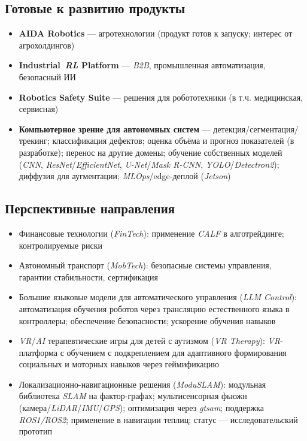 \documentclass[12pt,a4paper]{article}
\begin{document}
\subsection*{Готовые к развитию продукты}
\begin{itemize}
    \item \textbf{AIDA Robotics} --- агротехнологии (продукт готов к запуску; интерес от агрохолдингов)
    \item \textbf{Industrial~\textit{RL} Platform} --- \textit{B2B}, промышленная автоматизация, безопасный ИИ
    \item \textbf{Robotics Safety Suite} --- решения для робототехники (в т.ч. медицинская, сервисная)
    \item \textbf{Компьютерное зрение для автономных систем} --- детекция/сегментация/трекинг; классификация дефектов; оценка объёма и прогноз показателей (в разработке); перенос на другие домены; обучение собственных моделей (\textit{CNN}, \textit{ResNet}/\textit{EfficientNet}, \textit{U-Net}/\textit{Mask R-CNN}, \textit{YOLO}/\textit{Detectron2}); диффузия для аугментации; \textit{MLOps}/edge-деплой (\textit{Jetson})
\end{itemize}

\subsection*{Перспективные направления}
\begin{itemize}
    \item Финансовые технологии (\textit{FinTech}): применение \textit{CALF} в алготрейдинге; контролируемые риски
    \item Автономный транспорт (\textit{MobTech}): безопасные системы управления, гарантии стабильности, сертификация
    \item Большие языковые модели для автоматического управления (\textit{LLM Control}): автоматизация обучения роботов через трансляцию естественного языка в контроллеры; обеспечение безопасности; ускорение обучения навыков
    \item \textit{VR}/\textit{AI} терапевтические игры для детей с аутизмом (\textit{VR Therapy}): \textit{VR}-платформа с обучением с подкреплением для адаптивного формирования социальных и моторных навыков через геймификацию
    \item Локализационно-навигационные решения (\textit{ModuSLAM}): модульная библиотека \textit{SLAM} на фактор-графах; мультисенсорная фьюжн (камера/\textit{LiDAR}/\textit{IMU}/\textit{GPS}); оптимизация через \textit{gtsam}; поддержка \textit{ROS1/ROS2}; применение в навигации теплиц; статус --- исследовательский прототип

\end{itemize}
\end{document}
